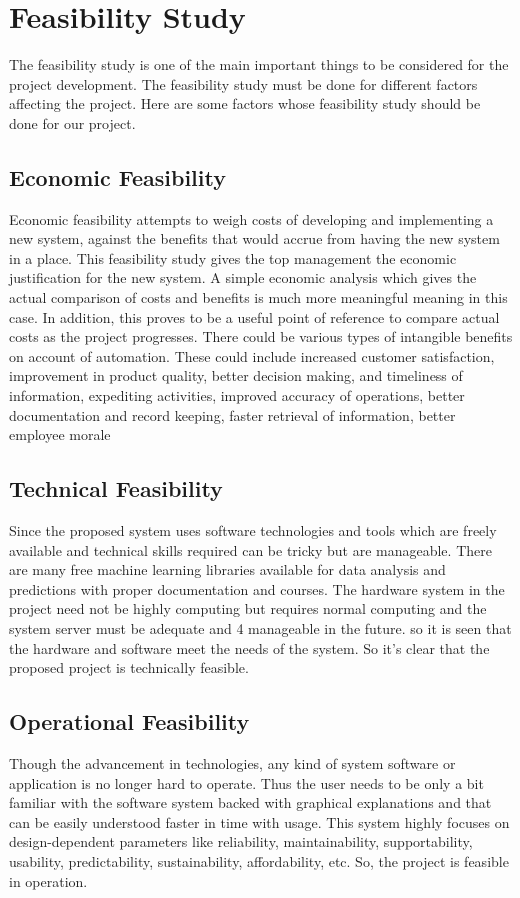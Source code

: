 \section{Feasibility Study}
The feasibility study is one of the main important things to be considered for the project 
development. The feasibility study must be done for different factors affecting the 
project. Here are some factors whose feasibility study should be done for our project.
\subsection{Economic Feasibility}
Economic feasibility attempts to weigh costs of developing and implementing a new 
system, against the benefits that would accrue from having the new system in a place. 
This feasibility study gives the top management the economic justification for the new 
system. A simple economic analysis which gives the actual comparison of costs and 
benefits is much more meaningful meaning in this case. In addition, this proves to be a 
useful point of reference to compare actual costs as the project progresses. There could 
be various types of intangible benefits on account of automation. These could include 
increased customer satisfaction, improvement in product quality, better decision 
making, and timeliness of information, expediting activities, improved accuracy of 
operations, better documentation and record keeping, faster retrieval of information, 
better employee morale
\subsection{Technical Feasibility}
 Since the proposed system uses software technologies and tools which are freely 
available and technical skills required can be tricky but are manageable. There are many 
free machine learning libraries available for data analysis and predictions with proper 
documentation and courses. The hardware system in the project need not be highly 
computing but requires normal computing and the system server must be adequate and 
4
manageable in the future. so it is seen that the hardware and software meet the needs of 
the system. So it’s clear that the proposed project is technically feasible.
\subsection{Operational Feasibility}
Though the advancement in technologies, any kind of system software or application is 
no longer hard to operate. Thus the user needs to be only a bit familiar with the software 
system backed with graphical explanations and that can be easily understood faster in 
time with usage. This system highly focuses on design-dependent parameters like 
reliability, maintainability, supportability, usability, predictability, sustainability, 
affordability, etc. So, the project is feasible in operation.
